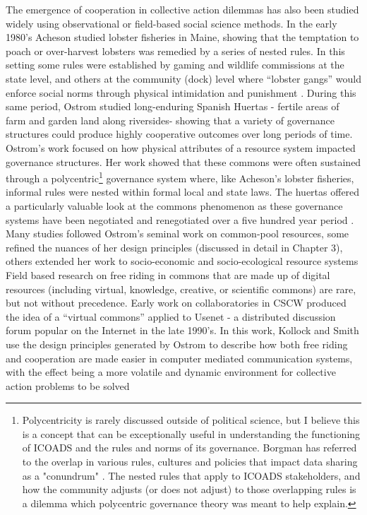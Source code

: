 \documentclass[thesis,tocnosub,noragright,centerchapter,12pt]{uiucecethesis09}
\begin{document}
The emergence of cooperation in collective action dilemmas has also been
studied widely using observational or field-based social science
methods. In the early 1980's Acheson studied lobster fisheries in Maine,
showing that the temptation to poach or over-harvest lobsters was
remedied by a series of nested rules. In this setting some rules were established by gaming and
wildlife commissions at the state level, and others at the community
(dock) level where ``lobster gangs'' would enforce social norms through
physical intimidation and punishment \citep{acheson1988lobster}. During this same
period, Ostrom studied long-enduring Spanish Huertas - fertile areas of
farm and garden land along riversides- showing that a variety of
governance structures could produce highly cooperative outcomes over
long periods of time. Ostrom's work focused on how physical attributes
of a resource system impacted governance structures. Her work showed
that these commons were often sustained through a polycentric\footnote{Polycentricity is rarely discussed outside of political science, but I believe this is a concept that can be exceptionally useful in understanding the functioning of ICOADS and the rules and norms of its governance. Borgman has referred to the overlap in various rules, cultures and policies that impact data sharing as a "conundrum" \citeyear{borgman2012conundrum}.  The nested rules that apply to ICOADS stakeholders, and how the community adjusts (or does not adjust) to those overlapping rules is a dilemma which polycentric governance theory was meant to help explain.}
governance system where, like Acheson's lobster fisheries, informal
rules were nested within formal local and state laws. The huertas
offered a particularly valuable look at the commons phenomenon as these
governance systems have been negotiated and renegotiated over a five
hundred year period \citep{ostrom1990governing}. Many studies followed Ostrom's
seminal work on common-pool resources, some refined the nuances of her
design principles (discussed in detail in Chapter 3), others extended
her work to socio-economic and socio-ecological resource systems \citep[,for a thorough overview]{folke2005adaptive, young2006globalization, ostrom2009understanding,}\\ 

Field based research on free riding in commons that are made up of
digital resources (including virtual, knowledge, creative, or scientific
commons) are rare, but not without precedence. Early work on
collaboratories in CSCW produced the idea of a ``virtual commons''
applied to Usenet - a distributed discussion forum popular on the Internet in the late 1990's. In this work, Kollock and
Smith use the design principles generated by Ostrom \citeyear{ostrom1990governing} to describe
how both free riding and cooperation are made easier in computer
mediated communication systems, with the effect being a more volatile
and dynamic environment for collective action problems to be solved \citeyear{kollock1996managing}\\
\end{document}
